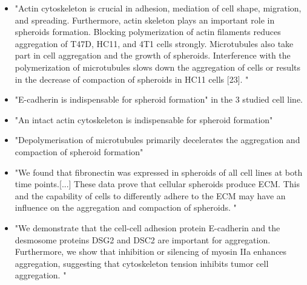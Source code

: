 \documentclass[11pt,a4paper]{article}
\begin{document}
\begin{itemize}
\item  "Actin cytoskeleton is crucial in adhesion, mediation of cell shape, migration, and spreading. Furthermore, actin skeleton plays an important role in spheroids formation. Blocking polymerization of actin filaments reduces aggregation of T47D, HC11, and 4T1 cells strongly. Microtubules also take part in cell aggregation and the growth of spheroids. Interference with the polymerization of microtubules slows down the aggregation of cells or results in the decrease of compaction of spheroids in HC11 cells [23]. "\cite{Bialkowska2020}
\item "E-cadherin is indispensable for spheroid formation" in the 3 studied cell line.\cite{Smyrek2018}
\item "An intact actin cytoskeleton is indispensable for spheroid formation" \cite{Smyrek2018}
\item "Depolymerisation of microtubules primarily decelerates the aggregation and compaction of spheroid formation" \cite{Smyrek2018}
\item "We found that fibronectin was expressed in spheroids of all cell lines at both time points.[...] These data prove that cellular spheroids produce ECM. This and the capability of cells to differently adhere to the ECM may have an influence on the aggregation and compaction of spheroids. "\cite{Smyrek2018}
\item "We demonstrate that the cell-cell adhesion protein E-cadherin and the desmosome proteins DSG2 and DSC2 are important for aggregation. Furthermore, we show that inhibition or silencing of myosin IIa enhances aggregation, suggesting that cytoskeleton tension inhibits tumor cell aggregation. "\cite{Saias2015}
\end{itemize}
\end{document}
